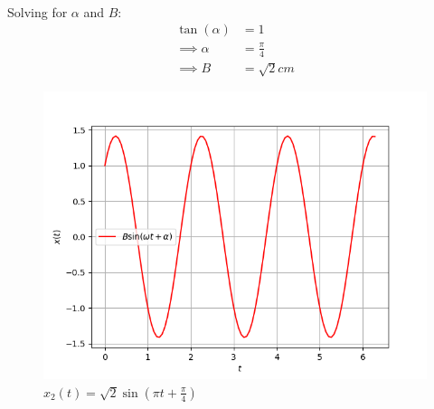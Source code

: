 \documentclass[journal,12pt,twocolumn]{IEEEtran}
\theoremstyle{remark}
\begin{document}
\begin{enumerate}
\begin{align}
\end{align}
Solving for $\alpha$ and $B$:
\begin{align}
    \tan(\alpha)& = 1\\
\implies
\alpha &= \frac{\pi}{4} \\
\implies 
B &=\sqrt{2}cm
\end{align}
\begin{figure}[h]
\renewcommand\thefigure{2}
    \centering
    \includegraphics[width=0.8\columnwidth]{figs/fig2.png}
    \caption{$x_2(t) = \sqrt{2}\sin(\pi t + \frac{\pi}{4})$}
    \label{Fig2_11.14.7}
\end{figure}
\end{enumerate}
\end{document}
